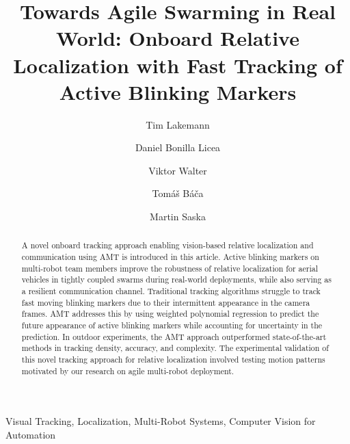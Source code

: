 \documentclass[lettersize,preprint]{elsarticle}
\begin{document}
\begin{frontmatter}

\title{Towards Agile Swarming in Real World: Onboard Relative Localization with Fast Tracking of Active Blinking Markers}

\author[1]{Tim Lakemann}
\author[1,2]{Daniel Bonilla Licea}
\author[1]{Viktor Walter}
\author[1]{Tomáš Báča}
\author[1]{Martin Saska}



\begin{abstract}
A novel onboard tracking approach enabling vision-based relative localization and communication using \gls{AMT} is introduced in this article.
Active blinking markers on multi-robot team members improve the robustness of relative localization for aerial vehicles in tightly coupled swarms during real-world deployments, while also serving as a resilient communication channel.
Traditional tracking algorithms struggle to track fast moving blinking markers due to their intermittent appearance in the camera frames.
\gls{AMT} addresses this by using weighted polynomial regression to predict the future appearance of active blinking markers while accounting for uncertainty in the prediction.
In outdoor experiments, the \gls{AMT} approach outperformed state-of-the-art methods in tracking density, accuracy, and complexity. 
The experimental validation of this novel tracking approach for relative localization involved testing motion patterns motivated by our research on agile multi-robot deployment.
\end{abstract}


\begin{keyword}
Visual Tracking, Localization, Multi-Robot Systems, Computer Vision for Automation
\end{keyword}

\end{frontmatter}
\end{document}
